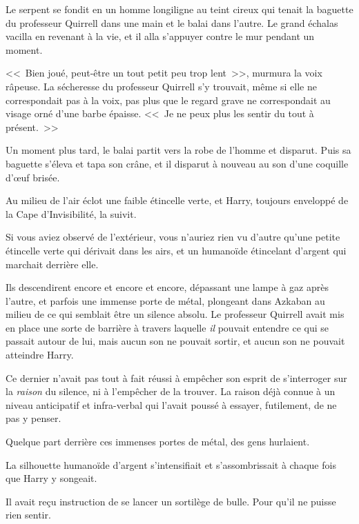 Le serpent se fondit en un homme longiligne au teint cireux qui tenait la baguette du professeur Quirrell dans une main et le balai dans l'autre. Le grand échalas vacilla en revenant à la vie, et il alla s'appuyer contre le mur pendant un moment.

<<~Bien joué, peut-être un tout petit peu trop lent~>>, murmura la voix râpeuse. La sécheresse du professeur Quirrell s'y trouvait, même si elle ne correspondait pas à la voix, pas plus que le regard grave ne correspondait au visage orné d'une barbe épaisse. <<~Je ne peux plus les sentir du tout à présent.~>>

Un moment plus tard, le balai partit vers la robe de l'homme et disparut. Puis sa baguette s'éleva et tapa son crâne, et il disparut à nouveau au son d'une coquille d'œuf brisée.

Au milieu de l'air éclot une faible étincelle verte, et Harry, toujours enveloppé de la Cape d'Invisibilité, la suivit.

Si vous aviez observé de l'extérieur, vous n'auriez rien vu d'autre qu'une petite étincelle verte qui dérivait dans les airs, et un humanoïde étincelant d'argent qui marchait derrière elle.

\later

Ils descendirent encore et encore et encore, dépassant une lampe à gaz après l'autre, et parfois une immense porte de métal, plongeant dans Azkaban au milieu de ce qui semblait être un silence absolu. Le professeur Quirrell avait mis en place une sorte de barrière à travers laquelle \emph{il} pouvait entendre ce qui se passait autour de lui, mais aucun son ne pouvait sortir, et aucun son ne pouvait atteindre Harry.

Ce dernier n'avait pas tout à fait réussi à empêcher son esprit de s'interroger sur la \emph{raison} du silence, ni à l'empêcher de la trouver. La raison déjà connue à un niveau anticipatif et infra-verbal qui l'avait poussé à essayer, futilement, de ne pas y penser.

Quelque part derrière ces immenses portes de métal, des gens hurlaient.

La silhouette humanoïde d'argent s'intensifiait et s'assombrissait à chaque fois que Harry y songeait.

Il avait reçu instruction de se lancer un sortilège de bulle. Pour qu'il ne puisse rien sentir.

